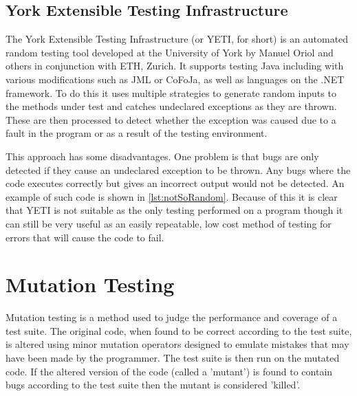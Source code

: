 \documentclass[authoryearcitations]{UoYCSproject}
\begin{document}
\subsection{York Extensible Testing Infrastructure}
The York Extensible Testing Infrastructure (or YETI, for short) is an automated random testing tool developed at the University of York by Manuel Oriol and others in conjunction with ETH, Zurich. It supports testing Java including with various modifications such as JML or CoFoJa, as well as languages on the .NET framework. To do this it uses multiple strategies to generate random inputs to the methods under test and catches undeclared exceptions as they are thrown. These are then processed to detect whether the exception was caused due to a fault in the program or as a result of the testing environment.

This approach has some disadvantages. One problem is that bugs are only detected if they cause an undeclared exception to be thrown. Any bugs where the code executes correctly but gives an incorrect output would not be detected. An example of such code is shown in \ref{lst:notSoRandom}. Because of this it is clear that YETI is not suitable as the only testing performed on a program though it can still be very useful as an easily repeatable, low cost method of testing for errors that will cause the code to fail.




\section{Mutation Testing}
Mutation testing is a method used to judge the performance and coverage of a test suite. The original code, when found to be correct according to the test suite, is altered using minor mutation operators designed to emulate mistakes that may have been made by the programmer. The test suite is then run on the mutated code. If the altered version of the code (called a 'mutant') is found to contain bugs according to the test suite then the mutant is considered 'killed'.
\end{document}
